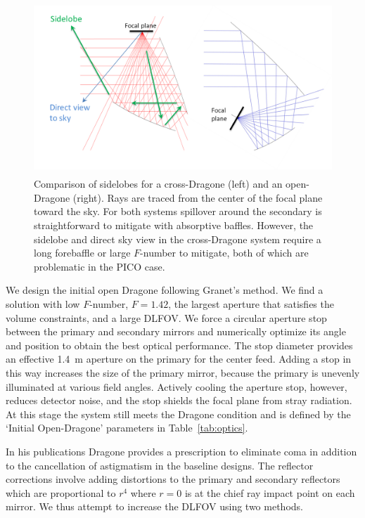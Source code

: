 \documentclass[]{spie}  %
\begin{document}
\begin{figure} [ht]
\begin{center}
\includegraphics[height=6.5cm]{sidelobes.png}
\end{center}
\caption { \label{fig:sidelobes} 
Comparison of sidelobes for a cross-Dragone (left) and an open-Dragone (right).  Rays are traced from the center 
of the focal plane toward the sky.
For both systems spillover around the secondary is straightforward to mitigate with absorptive baffles.  
However, the sidelobe and direct 
sky view in the cross-Dragone system require a long forebaffle or large $F$-number to mitigate, both of which are problematic in the PICO case.
}
\end{figure} 

We design the initial open Dragone following Granet's method\cite{granet2001}. 
We find a solution with low $F$-number, $F=1.42$, the largest aperture that satisfies the volume constraints, and a large 
DLFOV.  We force a circular aperture stop 
between the primary and secondary mirrors and numerically optimize its angle and position to obtain the best 
optical performance.  The stop diameter provides an effective 1.4~m aperture on the primary for the center feed.  
Adding a stop in this way increases the size of the primary mirror, because the primary is unevenly illuminated at various 
field angles.
Actively cooling the aperture stop, however, reduces detector noise, and the stop shields the 
focal plane from stray radiation. At this stage the system still meets 
the Dragone condition and is defined by the `Initial Open-Dragone' parameters in Table~\ref{tab:optics}.

In his publications Dragone provides a prescription to eliminate coma
in addition to the cancellation of astigmatism in the baseline designs.\cite{dragone_coma} The reflector corrections 
involve adding distortions to the primary and secondary reflectors 
which are proportional to $r^4$ where $r=0$ is at the chief ray impact point on each mirror. 
We thus attempt to increase the DLFOV using two methods. 
\end{document}
